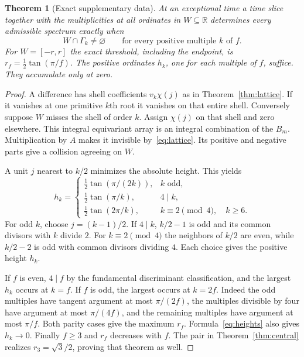 \documentclass[11pt,letterpaper]{article}
\newtheorem{theorem}{Theorem}[section]
\begin{document}
\begin{theorem}[Exact supplementary data]\label{thm:probe}
At an exceptional time a time slice together with the multiplicities at all ordinates in $W\subseteq\mathbb R$ determines every admissible spectrum exactly when
\begin{equation}\label{eq:hit}
 W\cap\Gamma_k\ne\varnothing\qquad\text{for every positive multiple }k\text{ of } f.
\end{equation}
For $W=[-r,r]$ the exact threshold, including the endpoint, is $r_f=\tfrac12\tan(\pi/f)$. The positive ordinates $h_k$, one for each multiple of $f$, suffice. They accumulate only at zero.
\end{theorem}
\begin{proof}
A difference has shell coefficients $v_k\chi(j)$ as in Theorem~\ref{thm:lattice}. If it vanishes at one primitive $k$th root it vanishes on that entire shell. Conversely suppose $W$ misses the shell of order $k$. Assign $\chi(j)$ on that shell and zero elsewhere. This integral equivariant array is an integral combination of the $B_m$. Multiplication by $A$ makes it invisible by~\eqref{eq:lattice}. Its positive and negative parts give a collision agreeing on $W$.

A unit $j$ nearest to $k/2$ minimizes the absolute height. This yields
\begin{equation}\label{eq:heights}
 h_k=\begin{cases}
 \tfrac12\tan(\pi/(2k)),& k\text{ odd},\\
 \tfrac12\tan(\pi/k),&4\mid k,\\
 \tfrac12\tan(2\pi/k),&k\equiv2\pmod4,\quad k\ge6 .
 \end{cases}
\end{equation}
For odd $k$, choose $j=(k-1)/2$. If $4\mid k$, $k/2-1$ is odd and its common divisors with $k$ divide $2$. For $k\equiv2\pmod4$ the neighbors of $k/2$ are even, while $k/2-2$ is odd with common divisors dividing $4$. Each choice gives the positive height $h_k$.

If $f$ is even, $4\mid f$ by the fundamental discriminant classification, and the largest $h_k$ occurs at $k=f$. If $f$ is odd, the largest occurs at $k=2f$. Indeed the odd multiples have tangent argument at most $\pi/(2f)$, the multiples divisible by four have argument at most $\pi/(4f)$, and the remaining multiples have argument at most $\pi/f$. Both parity cases give the maximum $r_f$. Formula~\eqref{eq:heights} also gives $h_k\to0$. Finally $f\ge3$ and $r_f$ decreases with $f$. The pair in Theorem~\ref{thm:central} realizes $r_3=\sqrt3/2$, proving that theorem as well.
\end{proof}
\end{document}
